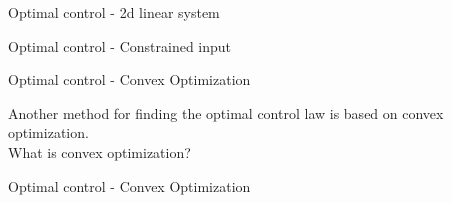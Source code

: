 \documentclass[usenames,dvipsnames,xcolor=table]{beamer}
\begin{document}
\begin{frame}{Optimal control - 2d linear system}
\begin{center}
\end{center}
\end{frame}


\begin{frame}{Optimal control - Constrained input}
\begin{center}
\end{center}
\end{frame}


\begin{frame}{Optimal control - Convex Optimization}
\begin{center}
Another method for finding the optimal control law is based on convex optimization.\\What is convex optimization?\\[2pt]
\only<1>{
	
}
\end{center}
\end{frame}


\begin{frame}{Optimal control - Convex Optimization}
\begin{center}
\end{center}
\end{frame}
\end{document}
